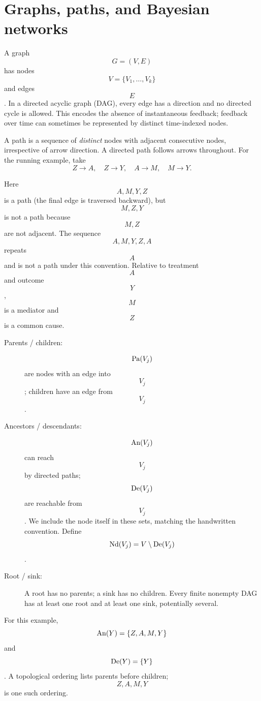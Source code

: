 \section{Graphs, paths, and Bayesian networks}
A graph $$G=(V,E)$$ has nodes $$V=\{V_1,\ldots,V_k\}$$ and edges $$E$$. In a directed acyclic graph (DAG), every edge has a direction and no directed cycle is allowed. This encodes the absence of instantaneous feedback; feedback over time can sometimes be represented by distinct time-indexed nodes.

A path is a sequence of \emph{distinct} nodes with adjacent consecutive nodes, irrespective of arrow direction. A directed path follows arrows throughout. For the running example, take
\begin{equation}
Z\to A,\quad Z\to Y,\quad A\to M,\quad M\to Y.
\end{equation}
\begin{center}
\end{center}
Here $$A,M,Y,Z$$ is a path (the final edge is traversed backward), but $$M,Z,Y$$ is not a path because $$M,Z$$ are not adjacent. The sequence $$A,M,Y,Z,A$$ repeats $$A$$ and is not a path under this convention. Relative to treatment $$A$$ and outcome $$Y$$, $$M$$ is a mediator and $$Z$$ is a common cause.
\begin{description}
\item[Parents / children:] $$\operatorname{Pa}(V_j)$$ are nodes with an edge into $$V_j$$; children have an edge from $$V_j$$.
\item[Ancestors / descendants:] $$\operatorname{An}(V_j)$$ can reach $$V_j$$ by directed paths; $$\operatorname{De}(V_j)$$ are reachable from $$V_j$$. We include the node itself in these sets, matching the handwritten convention. Define $$\operatorname{Nd}(V_j)=V\setminus\operatorname{De}(V_j)$$.
\item[Root / sink:] A root has no parents; a sink has no children. Every finite nonempty DAG has at least one root and at least one sink, potentially several.
\end{description}
For this example, $$\operatorname{An}(Y)=\{Z,A,M,Y\}$$ and $$\operatorname{De}(Y)=\{Y\}$$. A topological ordering lists parents before children; $$Z,A,M,Y$$ is one such ordering.

